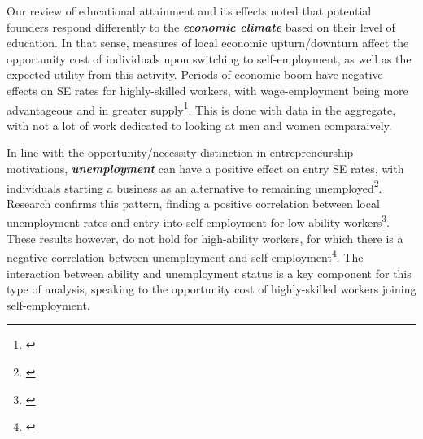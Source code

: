 Our review of educational attainment and its effects noted that potential founders respond differently to the \textbf{\textit{economic climate}} based on their level of education. In that sense, measures of local economic upturn/downturn affect the opportunity cost of individuals upon switching to self-employment, as well as the expected utility from this activity. Periods of economic boom have negative effects on SE rates for highly-skilled workers, with wage-employment being more advantageous and in greater supply\footnote{\cite{kangasharju2001regional}}. This is done with data in the aggregate, with not a lot of work dedicated to looking at men and women comparaively. 

In line with the opportunity/necessity distinction in entrepreneurship motivations, \textbf{\textit{unemployment}} can have a positive effect on entry SE rates, with individuals starting a business as an alternative to remaining unemployed\footnote{\cite{Deli2011}}. Research confirms this pattern, finding a positive correlation between local unemployment rates and entry into self-employment for low-ability workers\footnote{\cite{Deli2011}}. These results however, do not hold for high-ability workers, for which there is a negative correlation between unemployment and self-employment\footnote{\cite{Deli2011}}. The interaction between ability and unemployment status is a key component for this type of analysis, speaking to the opportunity cost of highly-skilled workers joining self-employment. 